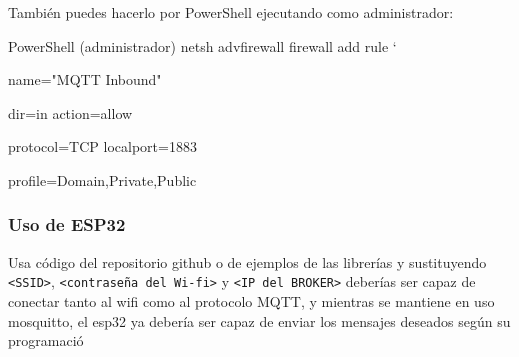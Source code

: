 \documentclass[12pt, a4paper]{article}
\begin{document}
\begin{umaappendices}
		
		También puedes hacerlo por PowerShell ejecutando como administrador:
		\begin{Terminal}{PowerShell (administrador)}
			netsh advfirewall firewall add rule `
			
			name="MQTT Inbound" 
			
			dir=in action=allow 
			
			protocol=TCP localport=1883
			
			profile=Domain,Private,Public
		\end{Terminal}
		
		\subsubsection{Uso de ESP32}
		Usa código del repositorio github o de ejemplos de las librerías y sustituyendo \texttt{<SSID>}, \texttt{<contraseña del Wi-fi>} y \texttt{<IP del BROKER>} deberías ser capaz de conectar tanto al wifi como al protocolo MQTT, y mientras se mantiene en uso mosquitto, el esp32 ya debería ser capaz de enviar los mensajes deseados según su programació
\end{umaappendices}
\end{document}

